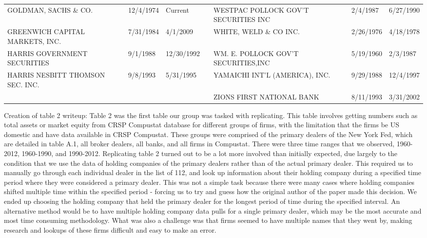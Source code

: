 \documentclass{article}
\begin{document}
\begin{adjustbox}{max width=\textwidth}
\begin{tabular}{lllllll}
GOLDMAN, SACHS \& CO.                & 12/4/1974 & Current &  & WESTPAC POLLOCK GOV'T SECURITIES INC & 2/4/1987 & 6/27/1990 \\
GREENWICH CAPITAL MARKETS, INC.      & 7/31/1984 & 4/1/2009 &  & WHITE, WELD \& CO INC.                & 2/26/1976 & 4/18/1978 \\
HARRIS GOVERNMENT SECURITIES        & 9/1/1988 & 12/30/1992 &  & WM. E. POLLOCK GOV'T SECURITIES,INC  & 5/19/1960 & 2/3/1987 \\
HARRIS NESBITT THOMSON SEC. INC.    & 9/8/1993 & 5/31/1995 &  & YAMAICHI INT'L (AMERICA), INC.      & 9/29/1988 & 12/4/1997 \\
 &  &  &  & ZIONS FIRST NATIONAL BANK            & 8/11/1993 & 3/31/2002 \\
\bottomrule
\end{tabular}
\end{adjustbox}

\par
Creation of table 2 writeup: Table 2 was the first table our group was tasked with replicating. This table involves getting numbers such as total assets or market equity from CRSP Compustat database for different groups of firms, with the limitation that the firms be US domestic and have data available in CRSP Compustat. These groups were comprised of the primary dealers of the New York Fed, which are detailed in table A.1, all broker dealers, all banks, and all firms in Compustat. There were three time ranges that we observed, 1960-2012, 1960-1990, and 1990-2012. Replicating table 2 turned out to be a lot more involved than initially expected, due largely to the condition that we use the data of holding companies of the primary dealers rather than of the actual primary dealer. This required us to manually go through each individual dealer in the list of 112, and look up information about their holding company during a specified time period where they were considered a primary dealer. This was not a simple task because there were many cases where holding companies shifted multiple time within the specified period - forcing us to try and guess how the original author of the paper made this decision. We ended up choosing the holding company that held the primary dealer for the longest period of time during the specified interval. An alternative method would be to have multiple holding company data pulls for a single primary dealer, which may be the most accurate and most time consuming methodology. What was also a challenge was that firms seemed to have multiple names that they went by, making research and lookups of these firms difficult and easy to make an error.
\end{document}

